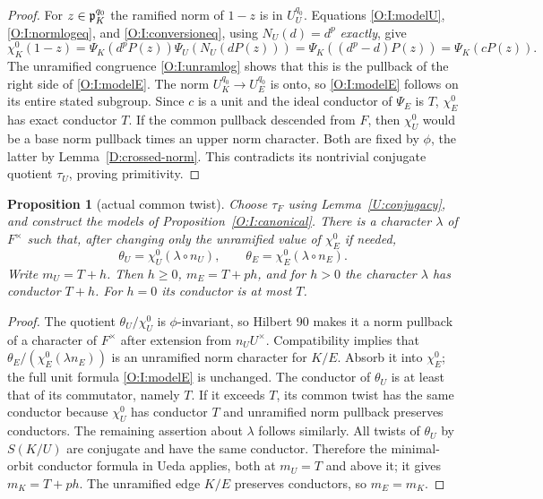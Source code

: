 \documentclass[11pt]{amsart}
\newtheorem{proposition}[theorem]{Proposition}
\theoremstyle{definition}
\theoremstyle{remark}
\begin{document}
\begin{proof}
For $z\in\mathfrak p_K^{q_0}$ the ramified norm of $1-z$ is in $U_U^{q_0}$.
Equations \eqref{O:I:modelU}, \eqref{O:I:normlogeq}, and \eqref{O:I:conversioneq},
using $N_U(d)=d^p$ \emph{exactly}, give
\[
 \chi_K^0(1-z)
 =\Psi_K(d^pP(z))\Psi_U(N_U(dP(z)))
 =\Psi_K((d^p-d)P(z))=\Psi_K(cP(z)).
\]
The unramified congruence \eqref{O:I:unramlog} shows that this is the pullback
of the right side of \eqref{O:I:modelE}. The norm $U_K^{q_0}\to U_E^{q_0}$
is onto, so \eqref{O:I:modelE} follows on its entire stated subgroup.
Since $c$ is a unit and the ideal conductor of $\Psi_E$ is $T$,
$\chi_E^0$ has exact conductor $T$. If the common pullback descended from
$F$, then $\chi_U^0$ would be a base norm pullback times an upper norm
character. Both are fixed by $\phi$, the latter by
Lemma~\ref{D:crossed-norm}. This contradicts its nontrivial conjugate
quotient $\tau_U$, proving primitivity.
\end{proof}


\begin{proposition}[actual common twist]\label{O:I:actualtwist}
Choose $\tau_F$ using Lemma~\ref{U:conjugacy}, and construct the models of
Proposition~\ref{O:I:canonical}. There is a character $\lambda$ of $F^\times$
such that, after changing only the unramified value of $\chi_E^0$ if needed,
\begin{equation}\label{O:I:twistpair}
 \theta_U=\chi_U^0(\lambda\circ n_U),\qquad
 \theta_E=\chi_E^0(\lambda\circ n_E).
\end{equation}
Write $m_U=T+h$. Then $h\ge0$, $m_E=T+ph$, and for $h>0$ the character
$\lambda$ has conductor $T+h$. For $h=0$ its conductor is at most $T$.
\end{proposition}
\begin{proof}
The quotient $\theta_U/\chi_U^0$ is $\phi$-invariant, so Hilbert 90
makes it a norm pullback of a character of $F^\times$ after extension
from $n_UU^\times$. Compatibility implies that
$\theta_E/(\chi_E^0(\lambda n_E))$ is an unramified norm character for
$K/E$. Absorb it into $\chi_E^0$; the full unit formula \eqref{O:I:modelE}
is unchanged.
The conductor of $\theta_U$ is at least that of its commutator, namely
$T$. If it exceeds $T$, its common twist has the same conductor because
$\chi_U^0$ has conductor $T$ and unramified norm pullback preserves
conductors. The remaining assertion about $\lambda$ follows similarly.
All twists of $\theta_U$ by $S(K/U)$ are conjugate and have the same
conductor. Therefore the minimal-orbit conductor formula in Ueda applies,
both at $m_U=T$ and above it; it gives $m_K=T+ph$.
The unramified edge $K/E$ preserves conductors, so $m_E=m_K$.
\end{proof}
\end{document}
